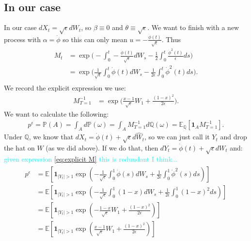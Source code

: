 \documentclass[11pt]{amsart}
\newcommand{\want}{p^{\epsilon}}
\newcommand{\noise}{\sqrt{\epsilon}}
\newcommand{\E}{\mathbb{E}}
\newcommand{\ind}{\mathbf{1}}
\newcommand{\ydnote}[1]{{\textcolor{cyan}{#1}}}
\begin{document}
\subsection{In our case}
In our case $dX_t = \noise dW_t$, so $\beta \equiv 0$ and $\theta \equiv \noise$.
We want to finish with a new process with $\alpha = \dot{\phi}$ so this can only
mean $u = -\frac{\dot{\phi}(t)}{\noise}$. Thus
\begin{align*}
  M_t &= \exp \bigg ( - \int_0^t -\frac{\dot{\phi}(t)}{\noise}dW_s 
  -\frac{1}{2} \int_0^t \frac{\dot{\phi}^2(t)}{\epsilon}ds \bigg ) \\
  &=  \exp \bigg ( \frac{1}{\noise} \int_0^t \dot{\phi}(t)dW_s 
  -\frac{1}{2\epsilon} \int_0^t \dot{\phi}^2(t)ds \bigg ). \\
\end{align*}
%
We record the explicit expression we use:
%
\begin{align}\label{eq:explicit M}
  M_{T=1}^{-1} &= \exp \bigg ( \frac{x-1}{\noise} W_1 
  +\frac{(1-x)^2}{2\epsilon}  \bigg ).
\end{align}
%
We want to calculate the following:
%
\begin{align*}
  \want = \mathbb{P}(A) = \int_A d\mathbb{P}(\omega) = 
  \int_A M_{T=1}^{-1} d\mathbb{Q}(\omega) = \E_{\mathbb{Q}}[\ind_{A} M_{T=1}^{-1}].
\end{align*}
Under $\mathbb{Q}$, we know that $dX_t = \dot{\phi}(t) + \noise d\hat{W}_t$, so 
we can just call it $Y_t$ and drop the hat on $W$ (as we did above). If we do that,
then $dY_t = \dot{\phi}(t) + \noise dW_t$ and:
\ydnote{given expression \eqref{eq:explicit M} this is redundant I think...}
\begin{align}
  \begin{split}
  \want &= \E\left [ \ind_{ |Y_t| > 1 } \exp \left (
      -\frac{1}{\noise} \int_0^1 \dot{\phi}(s)dW_s  
      +\frac{1}{2\epsilon} \int_0^1 \dot{\phi}^2(s)ds \right ) \right ] \\
  &= \E\left [ \ind_{ |Y_t| > 1 } \exp \left (
      -\frac{1}{\noise} \int_0^1 (1-x) dW_s  
      +\frac{1}{2\epsilon} \int_0^1 (1-x)^2 ds \right ) \right ] \\
  &= \E\left [ \ind_{ |Y_t| > 1 } \exp \left (
      -\frac{1-x}{\noise} W_1 +\frac{(1-x)^2}{2\epsilon} \right ) \right ] \\
  &= \E\left [ \ind_{ |Y_t| > 1 } \exp \left (
     \frac{x-1}{\noise} W_1 +\frac{(1-x)^2}{2\epsilon} \right ) \right ] \\
 \end{split}
\end{align}
\end{document}
